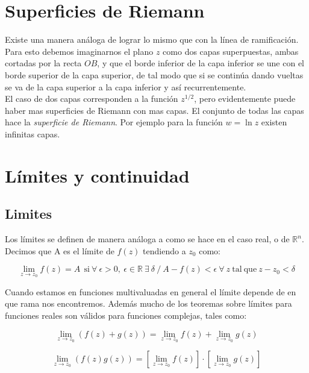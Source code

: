\documentclass[12pt]{book}
\newcommand{\ccorchetes}[1]{\left[ #1  \right]}
\begin{document}
\section{Superficies de Riemann} 

Existe una manera análoga de lograr lo mismo que con la línea de ramificación. Para esto debemos imaginarnos el plano $z$ como dos capas superpuestas, ambas cortadas por la recta $OB$, y que el borde inferior de la capa inferior se une con el borde superior de la capa superior, de tal modo que si se continúa dando vueltas se va de la capa superior a la capa inferior y así recurrentemente. \\

El caso de dos capas corresponden a la función $z^{1/2}$, pero evidentemente puede haber mas superficies de Riemann con mas capas. El conjunto de todas las capas hace la \textit{superficie de Riemann}. Por ejemplo para la función $w = \ln z$ existen infinitas capas.

\section{Límites y continuidad}

\subsection{Limites}

Los límites se definen de manera análoga a como se hace en el caso real, o de $\mathbb{R}^n$. Decimos que A es el límite de $f(z)$ tendiendo a $z_0$ como:

\begin{equation}
\lim_{z \rightarrow z_0} f(z)  = A  \ \ \mathrm{si} \ \forall \ \epsilon > 0, \ \epsilon \in \mathbb{R} \  \exists \ \delta \ / \ A - f(z) < \epsilon   \ \forall \ z \ \mathrm{tal \ que} \ z-z_0 < \delta
 \end{equation}

Cuando estamos en funciones multivaluadas en general el límite depende de en que rama nos encontremos. Además mucho de los teoremas sobre límites para funciones reales son válidos para funciones complejas, tales como:

\begin{equation}
\lim_{z \rightarrow z_0} (f(z)+g(z)) = \lim_{z \rightarrow z_0} f(z) + \lim_{z \rightarrow z_0} g(z)
\end{equation}

\begin{equation}
\lim_{z \rightarrow z_0} (f(z) g(z)) = \ccorchetes{\lim_{z \rightarrow z_0} f(z)} \cdot \ccorchetes{\lim_{z \rightarrow z_0} g(z) }
\end{equation}
\end{document}
